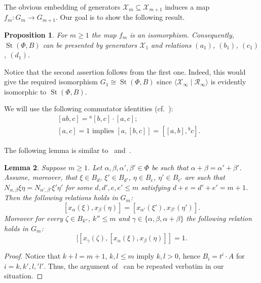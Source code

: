 \documentclass[oneside, 10pt]{amsart}
\DeclareMathOperator{\St}{St}
\newcommand{\XX}[1]{\mathcal{X}_{#1}}
\newcommand{\RR}[1]{\mathcal{R}_{#1}}
\numberwithin{equation}{section}
\newtheorem{lemma}{Lemma}
\numberwithin{lemma}{section}
\newtheorem{prop}[lemma]{Proposition}
\theoremstyle{definition}
\theoremstyle{remark}
\begin{document}
The obvious embedding of generators $\mathcal{X}_m \subseteq \mathcal{X}_{m+1}$ induces a map $f_m\colon G_m \to G_{m+1}$.
Our goal is to show the following result.
\begin{prop}\label{prop:tul3.3}
 For $m\geq 1$ the map $f_m$ is an isomorphism. Consequently, $\St(\Phi, B)$ can be presented by generators $\mathcal{X}_1$
  and relations $(a_1)$, $(b_1)$, $(c_1)$, $(d_1)$.
\end{prop}
Notice that the second assertion follows from the first one.
Indeed, this would give the required isomorphism $G_1 \cong \St(\Phi, B)$ since $\langle \XX{\infty} \mid \RR{\infty} \rangle$ is evidently isomorphic to $\St(\Phi, B)$.

We will use the following commutator identities (cf.~\cite[H1]{Re75}):
\begin{align}
 \label{eq:H1ii}  [ab, c] = {}^a[b, c] \cdot [a,c];&\\ %
 \label{eq:H1iii} [a,c]   = 1    \text{ implies } [a, [b,c]] = [[a,b],{}^bc].&
\end{align}

The following lemma is similar to~\cite[Proposition 1.1]{Re75} and~\cite[Proposition~3.2.2]{RS76}.
\begin{lemma}
 Suppose $m \geq 1$.
 Let $\alpha, \beta, \alpha', \beta' \in \Phi$ be such that $\alpha + \beta = \alpha' + \beta'$.
 Assume, moreover, that $\xi \in B_d$, $\xi' \in B_{d'}$, $\eta \in B_e$, $\eta' \in B_{e'}$ are such that 
  $N_{\alpha, \beta} \xi \eta = N_{\alpha', \beta'}\xi' \eta'$ for some $d,d',e,e'\leq m$ satisfying $d+e=d'+e' = m+1$.
 Then the following relations holds in $G_m$:
 \begin{equation}
  \label{item:i} [x_\alpha(\xi), x_\beta(\eta)] = [x_{\alpha'}(\xi'), x_{\beta'}(\eta')].
 \end{equation}
 Moreover for every $\zeta \in B_{k''}$, $k''\leq m$ and $\gamma\in\{\alpha, \beta, \alpha + \beta\}$
  the following relation holds in $G_m$:
 \begin{equation}
 \label{item:ii} [[x_\gamma(\zeta), [x_\alpha(\xi), x_\beta(\eta)]] = 1.
 \end{equation}
\end{lemma}
\begin{proof}
 Notice that $k+l = m+1$, $k, l\leq m$ imply $k,l>0$, hence $B_i= t^i \cdot A$ for $i=k,k',l,'l'$.
 Thus, the argument of~\cite[Proposition 1.1]{Re75} can be repeated verbatim in our situation.
\end{proof}
\end{document}
